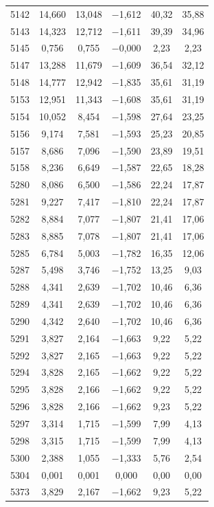 \begin{longtable}{lccccc}
5142 & 14,660 & 13,048 & $-$1,612 & 40,32 & 35,88 \\
5143 & 14,323 & 12,712 & $-$1,611 & 39,39 & 34,96 \\
5145 & 0,756 & 0,755 & $-$0,000 & 2,23 & 2,23 \\
5147 & 13,288 & 11,679 & $-$1,609 & 36,54 & 32,12 \\
5148 & 14,777 & 12,942 & $-$1,835 & 35,61 & 31,19 \\
5153 & 12,951 & 11,343 & $-$1,608 & 35,61 & 31,19 \\
5154 & 10,052 & 8,454 & $-$1,598 & 27,64 & 23,25 \\
5156 & 9,174 & 7,581 & $-$1,593 & 25,23 & 20,85 \\
5157 & 8,686 & 7,096 & $-$1,590 & 23,89 & 19,51 \\
5158 & 8,236 & 6,649 & $-$1,587 & 22,65 & 18,28 \\
5280 & 8,086 & 6,500 & $-$1,586 & 22,24 & 17,87 \\
5281 & 9,227 & 7,417 & $-$1,810 & 22,24 & 17,87 \\
5282 & 8,884 & 7,077 & $-$1,807 & 21,41 & 17,06 \\
5283 & 8,885 & 7,078 & $-$1,807 & 21,41 & 17,06 \\
5285 & 6,784 & 5,003 & $-$1,782 & 16,35 & 12,06 \\
5287 & 5,498 & 3,746 & $-$1,752 & 13,25 & 9,03 \\
5288 & 4,341 & 2,639 & $-$1,702 & 10,46 & 6,36 \\
5289 & 4,341 & 2,639 & $-$1,702 & 10,46 & 6,36 \\
5290 & 4,342 & 2,640 & $-$1,702 & 10,46 & 6,36 \\
5291 & 3,827 & 2,164 & $-$1,663 & 9,22 & 5,22 \\
5292 & 3,827 & 2,165 & $-$1,663 & 9,22 & 5,22 \\
5294 & 3,828 & 2,165 & $-$1,662 & 9,22 & 5,22 \\
5295 & 3,828 & 2,166 & $-$1,662 & 9,22 & 5,22 \\
5296 & 3,828 & 2,166 & $-$1,662 & 9,23 & 5,22 \\
5297 & 3,314 & 1,715 & $-$1,599 & 7,99 & 4,13 \\
5298 & 3,315 & 1,715 & $-$1,599 & 7,99 & 4,13 \\
5300 & 2,388 & 1,055 & $-$1,333 & 5,76 & 2,54 \\
5304 & 0,001 & 0,001 & 0,000 & 0,00 & 0,00 \\
5373 & 3,829 & 2,167 & $-$1,662 & 9,23 & 5,22 \\

\end{longtable}
